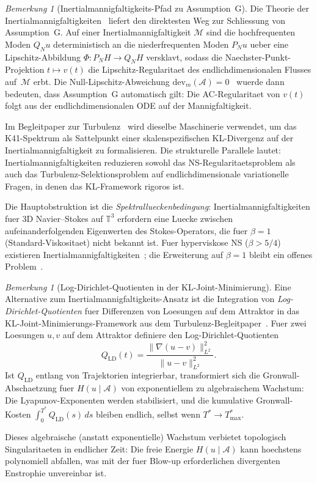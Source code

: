 \documentclass[12pt,a4paper]{article}
\theoremstyle{definition}
\theoremstyle{plain}
\theoremstyle{remark}
\newtheorem{remark}[definition]{Bemerkung}
\begin{document}
\begin{remark}[Inertialmannigfaltigkeits-Pfad zu Assumption~G]
\label{rem:inertial-manifold-path}
Die Theorie der Inertialmannigfaltigkeiten~\cite{FoiasSellTemam88} liefert
den direktesten Weg zur Schliessung von Assumption~G\@. Auf einer
Inertialmannigfaltigkeit $\mathcal{M}$ sind die hochfrequenten Moden
$Q_N u$ deterministisch an die niederfrequenten Moden $P_N u$ ueber eine
Lipschitz-Abbildung $\Phi \colon P_N H \to Q_N H$ versklavt, sodass die
Naechster-Punkt-Projektion $t \mapsto v(t)$ die Lipschitz-Regularitaet
des endlichdimensionalen Flusses auf~$\mathcal{M}$ erbt. Die
Null-Lipschitz-Abweichung
$\mathrm{dev}_m(\mathcal{A}) = 0$~\cite{BarbuCannone2016} wuerde dann
bedeuten, dass Assumption~G automatisch gilt: Die AC-Regularitaet von
$v(t)$ folgt aus der endlichdimensionalen ODE auf der Mannigfaltigkeit.

Im Begleitpaper zur Turbulenz~\cite{FST-TU2026} wird dieselbe
Maschinerie verwendet, um das K41-Spektrum als Sattelpunkt einer
skalenspezifischen KL-Divergenz auf der Inertialmannigfaltigkeit zu
formalisieren.
Die strukturelle Parallele lautet: Inertialmannigfaltigkeiten
reduzieren sowohl das NS-Regularitaetsproblem als auch das
Turbulenz-Selektionsproblem auf endlichdimensionale variationelle
Fragen, in denen das KL-Framework rigoros ist.

Die Hauptobstruktion ist die \emph{Spektrallueckenbedingung}:
Inertialmannigfaltigkeiten fuer 3D Navier--Stokes auf $\mathbb{T}^3$
erfordern eine Luecke zwischen aufeinanderfolgenden Eigenwerten des
Stokes-Operators, die fuer $\beta = 1$ (Standard-Viskositaet) nicht
bekannt ist. Fuer hyperviskose NS ($\beta > 5/4$) existieren
Inertialmannigfaltigkeiten~\cite{EdenFoiasNicolaenko1994}; die
Erweiterung auf $\beta = 1$ bleibt ein offenes
Problem~\cite{Zelik2014}.
\end{remark}

\begin{remark}[Log-Dirichlet-Quotienten in der KL-Joint-Minimierung]
\label{rem:log-dirichlet}
Eine Alternative zum Inertialmannigfaltigkeits-Ansatz ist die Integration
von \emph{Log-Dirichlet-Quotienten} fuer Differenzen von Loesungen auf
dem Attraktor in das KL-Joint-Minimierungs-Framework aus dem
Turbulenz-Begleitpaper~\cite{FST-TU2026}. Fuer zwei Loesungen $u, v$
auf dem Attraktor definiere den Log-Dirichlet-Quotienten
\[
  Q_{\mathrm{LD}}(t)
  = \frac{\|\nabla(u - v)\|_{L^2}^2}{\|u - v\|_{L^2}^2}.
\]
Ist $Q_{\mathrm{LD}}$ entlang von Trajektorien integrierbar, transformiert
sich die Gronwall-Abschaetzung fuer $H(u \mid \mathcal{A})$ von
exponentiellem zu algebraischem Wachstum: Die Lyapunov-Exponenten werden
stabilisiert, und die kumulative Gronwall-Kosten
$\int_0^{T^*} Q_{\mathrm{LD}}(s)\, ds$ bleiben endlich, selbst wenn
$T^* \to T^*_{\max}$.

Dieses algebraische (anstatt exponentielle) Wachstum verbietet
topologisch Singularitaeten in endlicher Zeit: Die freie Energie
$H(u \mid \mathcal{A})$ kann hoechstens polynomiell abfallen, was mit
der fuer Blow-up erforderlichen divergenten Enstrophie unvereinbar ist.
\end{remark}
\end{document}
